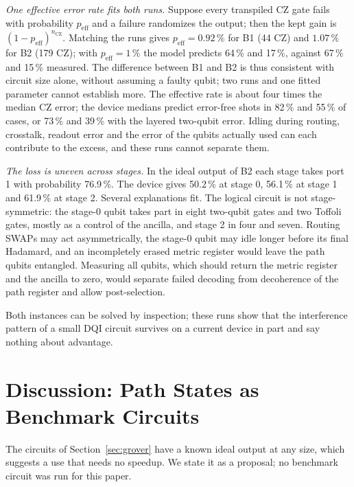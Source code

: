 \documentclass[journal]{IEEEtran}
\begin{document}
\emph{One effective error rate fits both runs.} Suppose every transpiled CZ gate fails with probability $p_{\mathrm{eff}}$ and a failure randomizes the output; then the kept gain is $(1-p_{\mathrm{eff}})^{n_{\mathrm{CZ}}}$. Matching the runs gives $p_{\mathrm{eff}}=0.92\,\%$ for B1 (44 CZ) and $1.07\,\%$ for B2 (179 CZ); with $p_{\mathrm{eff}}=1\,\%$ the model predicts 64\,\% and 17\,\%, against 67\,\% and 15\,\% measured. The difference between B1 and B2 is thus consistent with circuit size alone, without assuming a faulty qubit; two runs and one fitted parameter cannot establish more. The effective rate is about four times the median CZ error; the device medians predict error-free shots in 82\,\% and 55\,\% of cases, or 73\,\% and 39\,\% with the layered two-qubit error. Idling during routing, crosstalk, readout error and the error of the qubits actually used can each contribute to the excess, and these runs cannot separate them.

\emph{The loss is uneven across stages.} In the ideal output of B2 each stage takes port 1 with probability 76.9\,\%. The device gives 50.2\,\% at stage 0, 56.1\,\% at stage 1 and 61.9\,\% at stage 2. Several explanations fit. The logical circuit is not stage-symmetric: the stage-0 qubit takes part in eight two-qubit gates and two Toffoli gates, mostly as a control of the ancilla, and stage 2 in four and seven. Routing SWAPs may act asymmetrically, the stage-0 qubit may idle longer before its final Hadamard, and an incompletely erased metric register would leave the path qubits entangled. Measuring all qubits, which should return the metric register and the ancilla to zero, would separate failed decoding from decoherence of the path register and allow post-selection.

Both instances can be solved by inspection; these runs show that the interference pattern of a small DQI circuit survives on a current device in part and say nothing about advantage.

\iffalse
\section{Discussion: Path States as Benchmark Circuits}
\label{sec:benchmark}

The circuits of Section~\ref{sec:grover} have a known ideal output at any size, which suggests a use that needs no speedup. We state it as a proposal; no benchmark circuit was run for this paper.
\end{document}
